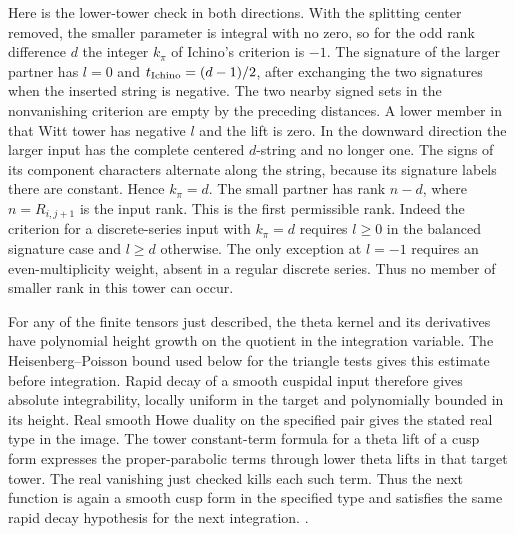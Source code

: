 Here is the lower-tower check in both directions. With the
splitting center removed, the smaller parameter is integral
with no zero, so for the odd rank difference \(d\) the integer
\(k_\pi\) of Ichino's criterion is \(-1\).
The signature of the larger partner has \(l=0\) and
\(t_{\rm Ichino}=(d-1)/2\), after exchanging the two signatures
when the inserted string is negative. The two nearby signed
sets in the nonvanishing criterion are empty by the preceding
distances. A lower member in that Witt tower has negative \(l\)
and the lift is zero. In the downward direction the larger
input has the complete centered \(d\)-string and no longer one.
The signs of its component characters alternate along the
string, because its signature labels there are constant.
Hence \(k_\pi=d\). The small partner has rank \(n-d\),
where \(n=R_{i,j+1}\) is the input rank. This is the first
permissible rank. Indeed the criterion for a discrete-series input with
\(k_\pi=d\) requires \(l\ge0\) in the balanced signature case
and \(l\ge d\) otherwise. The only exception at \(l=-1\)
requires an even-multiplicity weight, absent in a regular
discrete series. Thus no member of smaller rank in this
tower can occur.
\cite[\S6.1, Theorem~6.1 and Remark~6.2]{p2ichino-real-theta}

For any of the finite tensors just described, the theta kernel
and its derivatives have polynomial height growth on the
quotient in the integration variable. The Heisenberg--Poisson
bound used below for the triangle tests gives this estimate
before integration. Rapid decay of a smooth cuspidal input
therefore gives absolute integrability, locally uniform in the
target and polynomially bounded in its height. Real smooth
Howe duality on the specified pair gives the stated real type
in the image. The tower constant-term formula for a theta
lift of a cusp form expresses the proper-parabolic terms
through lower theta lifts in that target tower. The real
vanishing just checked kills each such term. Thus the next
function is again a smooth cusp form in the specified type
and satisfies the same rapid decay hypothesis for the next
integration.
\cite[Theorems~A and~2.23--2.24]{p2miller-schmid-decay}
\cite[Proposition~3.1]{p2wu-unitary-tower}
.

